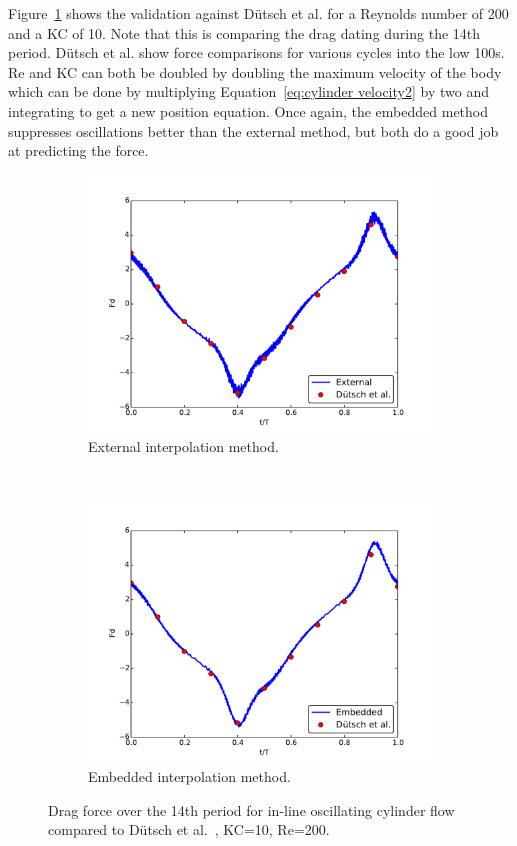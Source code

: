 \documentclass[preprint,12pt,5p]{elsarticle}
\begin{document}
Figure~\ref{fig:KC 10} shows the validation against D\"{u}tsch et al. for a Reynolds number of 200 and a KC of 10. 
Note that this is comparing the drag dating during the 14th period. 
D\"{u}tsch et al. show force comparisons for various cycles into the low 100s.
Re and KC can both be doubled by doubling the maximum velocity of the body which can be done by multiplying Equation~\eqref{eq:cylinder velocity2} by two and integrating to get a new position equation.
Once again, the embedded method suppresses oscillations better than the external method, but both do a good job at predicting the force. 
\begin{figure}[!htb]
	\centering
	\par\medskip
	\begin{subfigure}{0.5\textwidth}
		\includegraphics[width=\linewidth]{External_static_kc10}
		\caption{External interpolation method.}
	\end{subfigure}
	~
	\begin{subfigure}{0.5\textwidth}
		\includegraphics[width=\linewidth]{Embedded_static_kc10}
		\caption{Embedded interpolation method.}
	\end{subfigure}
	\caption{Drag force over the 14th period for in-line oscillating cylinder flow compared to D\"{u}tsch et al.~\cite{dutsch1998low}, KC=10, Re=200.}
	\label{fig:KC 10}
\end{figure}
\end{document}
